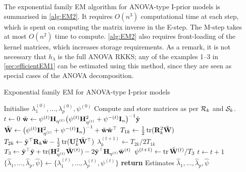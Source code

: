 The exponential family EM algorithm for ANOVA-type I-prior models is summarised in \cref{alg:EM2}.
It requires $O(n^3)$ computational time at each step, which is spent on computing the matrix inverse in the E-step.
The M-step takes at most $O(n^2)$ time to compute.
\cref{alg:EM2} also requires front-loading of the kernel matrices, which increases storage requirements. 
As a remark, it is not necessary that $h_\lambda$ is the full ANOVA RKKS; any of the examples 1--3 in \cref{sec:efficientEM1} can be estimated using this method, since they are seen as special cases of the ANOVA decomposition.

\vspace{0.5em}
\begin{algorithm}[hbt]
\caption{Exponential family EM for ANOVA-type I-prior models}\label{alg:EM2}
\begin{algorithmic}[1]
    \State Initialise $\lambda_1^{(0)},\dots,\lambda_p^{(0)}, \psi^{(0)}$
    \State Compute and store matrices as per ${\mathcal R}_k$ and ${\mathcal S}_k$.
    \State $t \gets 0$
  \EndProcedure 
  \Statex
      \State $\tilde{\mathbf w} \gets \psi^{(t)} {\mathbf H}_{\eta^{(t)}} \big(\psi^{(t)} {\mathbf H}_{\eta^{(t)}}^2 + \psi^{-(t)}{\mathbf I}_n \big)^{-1} \tilde{{\mathbf y}}$
      \State $\tilde{\mathbf W} \gets \big(\psi^{(t)} {\mathbf H}_{\eta^{(t)}}^2 + \psi^{-(t)}{\mathbf I}_n \big)^{-1} + \tilde{\mathbf w}\tilde{\mathbf w}^{\top}$
    \EndProcedure
    \Statex
        \State $T_{1k} \gets \frac{1}{2} \operatorname{tr}({\mathbf R}_k^2 \tilde{\mathbf W})$
        \State $T_{2k} \gets \tilde{{\mathbf y}}^\top {\mathbf R}_k \tilde{\mathbf w} - \frac{1}{2} \operatorname{tr}({\mathbf U}_k^2 \tilde{\mathbf W}^\top)$
        \State $\lambda_k^{(t+1)} \gets T_{2k} / 2T_{1k}$
      \EndFor
      \State $T_3 \gets \tilde{{\mathbf y}}^\top\tilde{{\mathbf y}} + \operatorname{tr}({\mathbf H}_{\eta^{(t)}}^2\tilde{\mathbf W}^{(t)}) - 2\tilde{{\mathbf y}}^\top{\mathbf H}_{\eta^{(t)}}\tilde{\mathbf w}^{(t)}$
      \State $\psi^{(t+1)} \gets \operatorname{tr} \tilde{\mathbf W}^{(t)} / T_3$
    \EndProcedure
    \State $t \gets t+1$
  \EndWhile
  \Statex
  \State $\{ \hat\lambda_1,\dots,\hat\lambda_p, \hat\psi \} \gets \{ \lambda_1^{(t)},\dots,\lambda_p^{(t)}, \psi^{(t)} \}$
  \State \textbf{return} Estimates $\hat\lambda_1,\dots,\hat\lambda_p, \hat\psi$
\end{algorithmic}
\end{algorithm}


